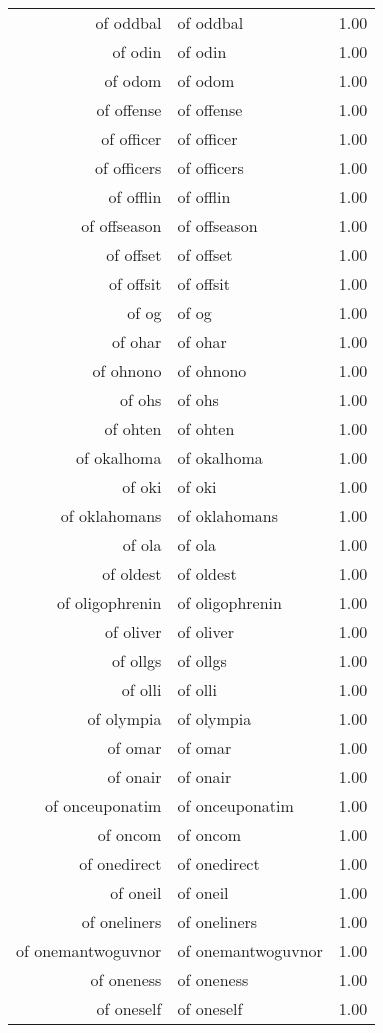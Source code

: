 \begin{table}[ht]
\begin{tabular}{rlr}
  of oddbal & of oddbal & 1.00 \\ 
  of odin & of odin & 1.00 \\ 
  of odom & of odom & 1.00 \\ 
  of offense & of offense & 1.00 \\ 
  of officer & of officer & 1.00 \\ 
  of officers & of officers & 1.00 \\ 
  of offlin & of offlin & 1.00 \\ 
  of offseason & of offseason & 1.00 \\ 
  of offset & of offset & 1.00 \\ 
  of offsit & of offsit & 1.00 \\ 
  of og & of og & 1.00 \\ 
  of ohar & of ohar & 1.00 \\ 
  of ohnono & of ohnono & 1.00 \\ 
  of ohs & of ohs & 1.00 \\ 
  of ohten & of ohten & 1.00 \\ 
  of okalhoma & of okalhoma & 1.00 \\ 
  of oki & of oki & 1.00 \\ 
  of oklahomans & of oklahomans & 1.00 \\ 
  of ola & of ola & 1.00 \\ 
  of oldest & of oldest & 1.00 \\ 
  of oligophrenin & of oligophrenin & 1.00 \\ 
  of oliver & of oliver & 1.00 \\ 
  of ollgs & of ollgs & 1.00 \\ 
  of olli & of olli & 1.00 \\ 
  of olympia & of olympia & 1.00 \\ 
  of omar & of omar & 1.00 \\ 
  of onair & of onair & 1.00 \\ 
  of onceuponatim & of onceuponatim & 1.00 \\ 
  of oncom & of oncom & 1.00 \\ 
  of onedirect & of onedirect & 1.00 \\ 
  of oneil & of oneil & 1.00 \\ 
  of oneliners & of oneliners & 1.00 \\ 
  of onemantwoguvnor & of onemantwoguvnor & 1.00 \\ 
  of oneness & of oneness & 1.00 \\ 
  of oneself & of oneself & 1.00 \\ 

\end{tabular}
\end{table}
